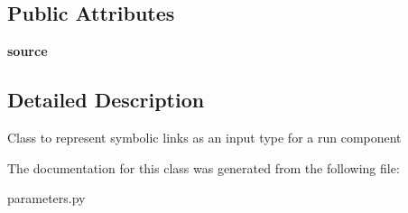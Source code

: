 \subsection*{Public Attributes}
\begin{DoxyCompactItemize}
\item 
\mbox{\label{classcodar_1_1cheetah_1_1parameters_1_1_sym_link_a44311787db039f8d36a5f649f2aaba5e}} 
{\bfseries source}
\end{DoxyCompactItemize}


\subsection{Detailed Description}
\begin{DoxyVerb}Class to represent symbolic links as an input type for a run component
\end{DoxyVerb}
 

The documentation for this class was generated from the following file\+:\begin{DoxyCompactItemize}
\item 
parameters.\+py\end{DoxyCompactItemize}
